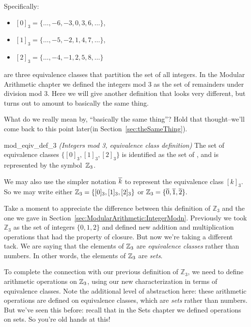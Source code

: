 \noindent
Specifically:
\begin{itemize}
\item[]
$[0]_3 = \{ \ldots, -6, -3, 0, 3, 6, \ldots \}$,
\item[]
$[1]_3 = \{ \ldots, -5, -2, 1, 4, 7, \ldots \}$,
\item[]
$[2]_3 = \{ \ldots, -4, -1, 2, 5, 8, \ldots \}$
\end{itemize}
are three equivalence classes that partition the set of all  integers.
In the Modular Arithmetic chapter we defined the integers mod 3 as the set of remainders under division mod 3. Here we will give another definition that looks very different, but turns out to amount to basically the same thing.

\begin{rem}
What do we really mean by, ``basically the same thing''? Hold that thought--we'll come back to this point later(in Section~\ref{sec:theSameThing}).
 \end{rem}

\begin{defn}{mod_eqiv_def_3} \emph{(Integers mod 3, equivalence class definition)}
The set of equivalence classes $\{ [0]_3, [1]_3, [2]_3 \}$ is identified as the set of , and is represented by the symbol~$\mathbb{Z}_3$.

We may also use the simpler notation $\overline{k}$ to represent the equivalence class  $[k]_3$. So we may write either  
$\mathbb{Z}_3 = \{ [0]_3, [1]_3, [2]_3 \}$ or $\mathbb{Z}_3 = \{ \overline{0}, \overline{1}, \overline{2} \} .$
\end{defn}

Take a moment to appreciate the difference between this definition of $\mathbb{Z}_3$  and the one we gave in Section~\ref{sec:ModularArithmetic:IntegerModn}. Previously we took $\mathbb{Z}_3$ as the set of integers $\{0,1,2\}$ and defined new addition and multiplication operations that had the property of closure. But now we're taking a different tack. We are saying that the elements of $\mathbb{Z}_3$ are \emph{equivalence classes} rather than numbers. In other words, the elements of $\mathbb{Z}_3$ are \emph{sets}.

To complete the connection with our previous definition of  $\mathbb{Z}_3$, we need to define arithmetic operations on $\mathbb{Z}_3$, using our new characterization in terms of equivalence classes. Note the additional level of abstraction here: these arithmetic operations are defined on equivalence classes, which are \emph{sets} rather than numbers. But we've seen this before: recall that in the Sets chapter we defined operations on sets. So you're old hands at this!

